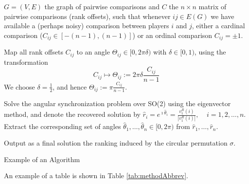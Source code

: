 \documentclass[11pt]{article}
\begin{document}
\begin{algorithm}[h!]
\begin{algorithmic}[1]
\REQUIRE $G=(V,E)$ the graph of pairwise comparisons and $C$ the $n \times n $ matrix of pairwise comparisons (rank offsets), such that whenever $ij \in E(G)$ we have available a (perhaps noisy) comparison between players $i$ and $j$, either a cardinal comparison ($C_{ij} \in [-(n-1), (n-1)]$) or an ordinal comparison $C_{ij} = \pm 1$.

\STATE Map all rank offsets $C_{ij}$ to an angle $\Theta_{ij} \in [0, 2 \pi  \delta )$ with $\delta \in [0,1)$, using the transformation 
\begin{equation}
	C_{ij}  \mapsto \Theta_{ij} :=  2 \pi  \delta  \frac{ C_{ij}}{n-1} 
	\label{transfToCircle}
\end{equation}
We choose $\delta = \frac{1}{2}$, and hence $\Theta_{ij} :=  \pi  \frac{ C_{ij}}{n-1} $.

\STATE Solve the angular synchronization problem over SO(2) using the eigenvector method, and denote the recovered solution by 
$ \hat{r}_i =  e^{\imath \hat{\theta}_i} = \frac{v_1^R(i)}{|v_1^R(i)|} , \;\;\;\; i=1,2,\ldots, n$.
\STATE Extract the corresponding set of angles $\hat{\theta}_1,\ldots,\hat{\theta}_n \in [0,2\pi)$ from $\hat{r}_1, \ldots,\hat{r}_n$.

\STATE  Output as a final solution the ranking induced by the circular permutation $\sigma$.
\end{algorithmic}
\caption{ Example of an Algorithm}
\label{Algo:listSync}
\end{algorithm}

\clearpage




An example of a table is shown in Table  \ref{tab:methodAbbrev}.
\end{document}
